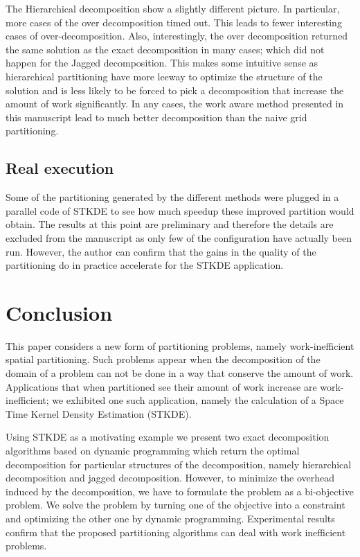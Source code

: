\documentclass[10pt, conference, compsocconf]{IEEEtran}
\begin{document}
The Hierarchical decomposition show a slightly different picture. In
particular, more cases of the over decomposition timed out. This leads
to fewer interesting cases of over-decomposition. Also, interestingly,
the over decomposition returned the same solution as the exact
decomposition in many cases; which did not happen for the Jagged
decomposition. This makes some intuitive sense as hierarchical
partitioning have more leeway to optimize the structure of the
solution and is less likely to be forced to pick a decomposition that
increase the amount of work significantly. In any cases, the work aware
method presented in this manuscript lead to much better decomposition
than the naive grid partitioning.

\subsection{Real execution}

Some of the partitioning generated by the different methods were
plugged in a parallel code of STKDE to see how much speedup these
improved partition would obtain. The results at this point are
preliminary and therefore the details are excluded from the manuscript
as only few of the configuration have actually been run. However, the
author can confirm that the gains in the quality of the partitioning
do in practice accelerate for the STKDE application.

\section{Conclusion}
\label{sec:ccl}

This paper considers a new form of partitioning problems, namely
work-inefficient spatial partitioning. Such problems appear when the
decomposition of the domain of a problem can not be done in a way that
conserve the amount of work. Applications that when partitioned see
their amount of work increase are work-inefficient; we exhibited one
such application, namely the calculation of a Space Time Kernel
Density Estimation (STKDE).

Using STKDE as a motivating example we present two exact decomposition
algorithms based on dynamic programming which return the optimal
decomposition for particular structures of the decomposition, namely
hierarchical decomposition and jagged decomposition. However, to
minimize the overhead induced by the decomposition, we have to
formulate the problem as a bi-objective problem. We solve the problem
by turning one of the objective into a constraint and optimizing the
other one by dynamic programming. Experimental results confirm that
the proposed partitioning algorithms can deal with work inefficient
problems.
\end{document}

